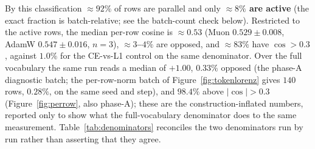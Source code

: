 By this classification
${\approx}92\%$ of rows are parallel and only \textbf{${\approx}8\%$
are active} (the exact fraction is batch-relative; see the batch-count check below). Restricted to the
active rows, the median per-row cosine is \textbf{${\approx}0.53$} (Muon
$0.529{\pm}0.008$, AdamW $0.547{\pm}0.016$, $n{=}3$), \textbf{${\approx}3$--$4\%$} are
opposed, and ${\approx}83\%$ have $\cos > 0.3$, against $1.0\%$ for the CE-vs-L1
control on the same denominator. Over the full vocabulary the same
run reads a median of $+1.00$, $0.33\%$ opposed (the phase-A diagnostic batch; the
per-row-norm batch of Figure~\ref{fig:tokenlorenz} gives $140$ rows, $0.28\%$, on the
same seed and step), and $98.4\%$ above $|\cos|>0.3$
(Figure~\ref{fig:perrow}, also phase-A); these are the construction-inflated numbers, reported
only to show what the full-vocabulary denominator does to the same measurement.
Table~\ref{tab:denominators} reconciles the two denominators run by run rather than
asserting that they agree.


